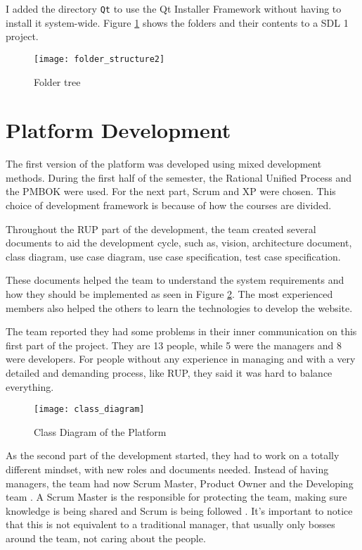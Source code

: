 I added the directory \texttt{Qt} to use the Qt Installer Framework without having to install it system-wide. Figure \ref{fig:folder_structure} shows the folders and their contents to a SDL 1 project.

\begin{figure}[h!]
\centering
\texttt{[image: folder\_structure2]}
\caption{Folder tree}
\label{fig:folder_structure}
\end{figure}

\section{Platform Development}
\label{sec:platform}

The first version of the platform was developed using mixed development methods. During the first half of the semester, the Rational Unified Process  and the PMBOK were used. For the next part, Scrum and XP were chosen. This choice of development framework is because of how the courses are divided.

Throughout the RUP part of the development, the team created several documents to aid the development cycle, such as, vision, architecture document, class diagram, use case diagram, use case specification, test case specification.

These documents helped the team to understand the system requirements and how they should be implemented as seen in Figure \ref{fig:class_diagram}. The most experienced members also helped the others to learn the technologies to develop the website.

The team reported they had some problems in their inner communication on this first part of the project. They are 13 people, while 5 were the managers and 8 were developers. For people without any experience in managing and with a very detailed and demanding process, like RUP, they said it was hard to balance everything.

\begin{figure}[h!]
\centering
\texttt{[image: class\_diagram]}
\caption{Class Diagram of the Platform \cite{plataforma2017arquitetura}}
\label{fig:class_diagram}
\end{figure}

As the second part of the development started, they had to work on a totally different mindset, with new roles and documents needed. Instead of having managers, the team had now Scrum Master, Product Owner and the Developing team \cite{agile422017}. A Scrum Master is the responsible for protecting the team, making sure knowledge is being shared and Scrum is being followed \cite{scrumalliance2017}. It's important to notice that this is not equivalent to a traditional manager, that usually only bosses around the team, not caring about the people.

